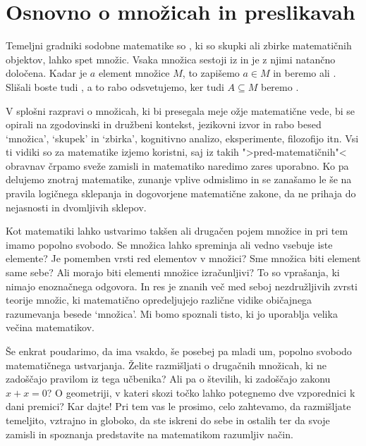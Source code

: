 \chapter{Osnovno o množicah in preslikavah}
\label{cha:mnozice-in-preslikave}


Temeljni gradniki sodobne matematike so , ki so skupki ali zbirke matematičnih
objektov, lahko spet množic. Vsaka množica sestoji iz  in je z njimi
natančno določena.
%
Kadar je $a$ element množice $M$, to zapišemo $a \in M$ in beremo  ali .
%
Slišali boste tudi , a to rabo odsvetujemo, ker tudi $A \subseteq M$ beremo .

V splošni razpravi o množicah, ki bi presegala meje ožje matematične vede, bi se opirali na
zgodovinski in družbeni kontekst, jezikovni izvor in rabo besed `množica', `skupek' in
`zbirka', kognitivno analizo, eksperimente, filozofijo itn. Vsi ti vidiki so za matematike
izjemo koristni, saj iz takih ">pred-matematičnih"< obravnav črpamo sveže zamisli in
matematiko naredimo zares uporabno. Ko pa delujemo znotraj matematike, zunanje vplive
odmislimo in se zanašamo le še na pravila logičnega sklepanja in dogovorjene matematične zakone, da ne
prihaja do nejasnosti in dvomljivih sklepov.

Kot matematiki lahko ustvarimo takšen ali drugačen pojem množice in pri tem imamo popolno
svobodo. Se množica lahko spreminja ali vedno vsebuje iste elemente? Je pomemben vrsti red
elementov v množici? Sme množica biti element same sebe? Ali morajo biti elementi množice
izračunljivi? To so vprašanja, ki nimajo enoznačnega odgovora. In res je znanih več med
seboj nezdružljivih zvrsti teorije množic, ki matematično opredeljujejo različne vidike
običajnega razumevanja besede `množica'. Mi bomo spoznali tisto, ki jo uporablja velika večina matematikov.

Še enkrat poudarimo, da ima vsakdo, še posebej pa mladi um, popolno svobodo matematičnega
ustvarjanja. Želite razmišljati o drugačnih množicah, ki ne zadoščajo pravilom iz tega učbenika?
Ali pa o številih, ki zadoščajo zakonu $x + x = 0$? O geometriji, v
kateri skozi točko lahko potegnemo dve vzporednici k dani premici? Kar dajte! Pri tem vas
le prosimo, celo zahtevamo, da razmišljate temeljito, vztrajno in globoko, da ste iskreni
do sebe in ostalih ter da svoje zamisli in spoznanja predstavite na matematikom razumljiv
način.



